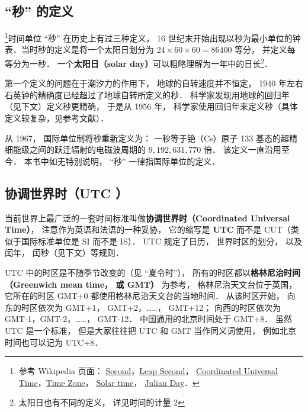 
\begin{issues}
\end{issues}

\subsection{“秒” 的定义}
\footnote{参考 Wikipedia 页面： \href{https://en.wikipedia.org/wiki/Second}{Second}，\href{https://en.wikipedia.org/wiki/Leap_second}{Leap Second}， \href{https://en.wikipedia.org/wiki/Coordinated_Universal_Time}{Coordinated Universal Time}，\href{https://en.wikipedia.org/wiki/Time_zone}{Time Zone}， \href{https://en.wikipedia.org/wiki/Solar_time}{Solar time}， \href{https://en.wikipedia.org/wiki/Julian_day}{Julian Day}．}时间单位 “秒” 在历史上有过三种定义， 16 世纪末开始出现以秒为最小单位的钟表．当时秒的定义是将一个太阳日划分为 $24\times60\times60 = 86400$ 等分， 并定义每等分为一秒． 一个\textbf{太阳日（solar day）}可以粗略理解为一年中的日长\footnote{太阳日也有不同的定义， 详见时间的计量 2}．

第一个定义的问题在于潮汐力的作用下， 地球的自转速度并不恒定， 1940 年左右石英钟的精确度已经超过了地球自转所定义的秒． 科学家发现用地球的回归年（见下文）定义秒更精确， 于是从 1956 年， 科学家使用回归年来定义秒（具体定义较复杂，见参考文献）．

从 1967， 国际单位制将秒重新定义为： 一秒等于铯（Cs）原子 133 基态的超精细能级之间的跃迁辐射的电磁波周期的 $9,192,631,770$ 倍． 该定义一直沿用至今． 本书中如无特别说明， “秒” 一律指国际单位的定义．

\subsection{协调世界时（UTC ）}
当前世界上最广泛的一套时间标准叫做\textbf{协调世界时（Coordinated Universal Time）}， 注意作为英语和法语的一种妥协， 它的缩写是 \textbf{UTC} 而不是 CUT（类似于国际标准单位是 SI 而不是 IS）． UTC 规定了日历， 世界时区的划分， 以及闰年， 闰秒（见下文）等规则．

UTC 中的时区是不随季节改变的（见 “夏令时”）， 所有的时区都以\textbf{格林尼治时间（Greenwich mean time， 或 GMT）} 为参考， 格林尼治天文台位于英国， 它所在的时区 GMT+0 都使用格林尼治天文台的当地时间． 从该时区开始， 向东的时区依次为 GMT+1， GMT+2，……， GMT+12； 向西的时区依次为 GMT-1，GMT-2，……， GMT-12． 中国通用的北京时间处于 GMT+8． 虽然 UTC 是一个标准， 但是大家往往把 UTC 和 GMT 当作同义词使用， 例如北京时间也可以记为 UTC+8．


